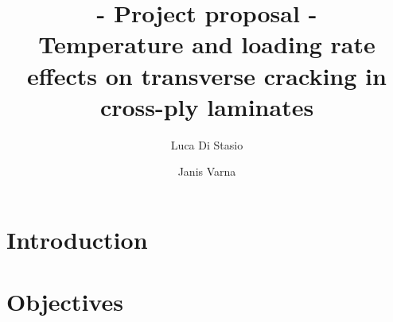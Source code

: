 \documentclass[review]{elsarticle}
\begin{document}
\begin{frontmatter}

\title{{\bf - Project proposal -}\\Temperature and loading rate effects on transverse cracking in cross-ply laminates}


\author{Luca Di Stasio}
\author{Janis Varna}






\end{frontmatter}

\linenumbers

\section{Introduction}



\section{Objectives}
\end{document}
